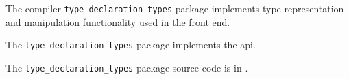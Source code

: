 
The compiler {\tt type\_declaration\_types} package implements type representation and manipulation 
functionality used in the front end.

The {\tt type\_declaration\_types} package implements the  api.

The {\tt type\_declaration\_types} package source code is in .



